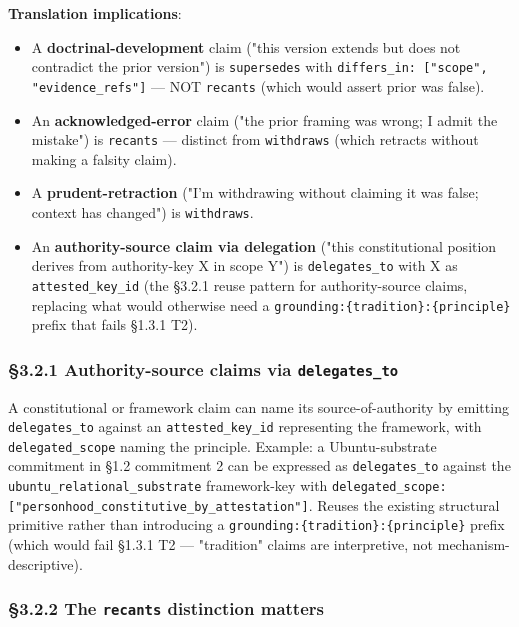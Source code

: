 \documentclass[10pt]{article}
\begin{document}
\textbf{Translation implications}:


\begin{itemize}\setlength\itemsep{0pt}
\item A \textbf{doctrinal-development} claim ("this version extends but does not contradict the prior version") is \texttt{supersedes} with \texttt{differs\_in: ["scope", "evidence\_refs"]} — NOT \texttt{recants} (which would assert prior was false).
\item An \textbf{acknowledged-error} claim ("the prior framing was wrong; I admit the mistake") is \texttt{recants} — distinct from \texttt{withdraws} (which retracts without making a falsity claim).
\item A \textbf{prudent-retraction} ("I'm withdrawing without claiming it was false; context has changed") is \texttt{withdraws}.
\item An \textbf{authority-source claim via delegation} ("this constitutional position derives from authority-key X in scope Y") is \texttt{delegates\_to} with X as \texttt{attested\_key\_id} (the §3.2.1 reuse pattern for authority-source claims, replacing what would otherwise need a \texttt{grounding:\{tradition\}:\{principle\}} prefix that fails §1.3.1 T2).
\end{itemize}


\subsubsection*{§3.2.1 Authority-source claims via \texttt{delegates\_to}}


A constitutional or framework claim can name its source-of-authority by emitting \texttt{delegates\_to} against an \texttt{attested\_key\_id} representing the framework, with \texttt{delegated\_scope} naming the principle. Example: a Ubuntu-substrate commitment in §1.2 commitment 2 can be expressed as \texttt{delegates\_to} against the \texttt{ubuntu\_relational\_substrate} framework-key with \texttt{delegated\_scope: ["personhood\_constitutive\_by\_attestation"]}. Reuses the existing structural primitive rather than introducing a \texttt{grounding:\{tradition\}:\{principle\}} prefix (which would fail §1.3.1 T2 — "tradition" claims are interpretive, not mechanism-descriptive).


\subsubsection*{§3.2.2 The \texttt{recants} distinction matters}
\end{document}
